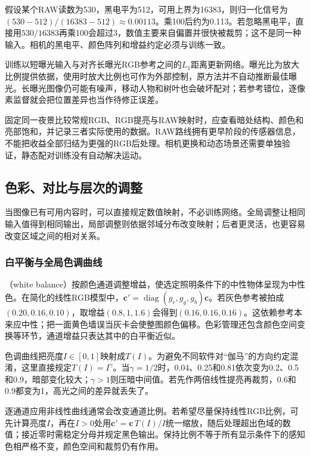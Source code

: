 假设某个RAW读数为530，黑电平为512，可用上界为16383，则归一化信号为$(530-512)/(16383-512)\approx0.00113$。乘100后约为0.113。若忽略黑电平，直接用$530/16383$再乘100会超过3，数值主要来自偏置并很快被裁剪；这不是同一种输入。相机的黑电平、颜色阵列和增益约定必须与训练一致。

训练以短曝光输入与对齐长曝光RGB参考之间的$L_1$距离更新网络。曝光比为放大比例提供依据，使用时放大比例也可作为外部控制，原方法并不自动推断最佳曝光。长曝光图像仍可能有噪声，移动人物和树叶也会破坏配对；若参考错位，逐像素监督就会把位置差异也当作待修正误差。

固定同一夜景比较常规RGB、RGB提亮与RAW映射时，应查看暗处结构、颜色和亮部饱和，并记录三者实际使用的数据。RAW路线拥有更早阶段的传感器信息，不能把收益全部归结为更强的RGB后处理。相机更换和动态场景还需要单独验证，静态配对训练没有自动解决运动。

\subsection{色彩、对比与层次的调整}
\label{sec:vision-restoration-tone}

当图像已有可用内容时，可以直接规定数值映射，不必训练网络。全局调整让相同输入值得到相同输出，局部调整则依据邻域分布改变映射；后者更灵活，也更容易改变区域之间的相对关系。

\subsubsection{白平衡与全局色调曲线}
\label{sec:vision-restoration-white-balance}

（white balance）按颜色通道调整增益，使选定照明条件下的中性物体呈现为中性色。在简化的线性RGB模型中，$\bm{c}'=\operatorname{diag}(g_r,g_g,g_b)\bm{c}$。若灰色参考被拍成$(0.20,0.16,0.10)$，取增益$(0.8,1,1.6)$会得到$(0.16,0.16,0.16)$。这依赖参考本来应中性；把一面黄色墙误当灰卡会使整图颜色偏移。色彩管理还包含颜色空间变换等环节，通道增益只表达其中的白平衡近似。

色调曲线把亮度$I\in[0,1]$映射成$T(I)$。为避免不同软件对“伽马”的方向约定混淆，这里直接规定$T(I)=I^\gamma$。当$\gamma=1/2$时，0.04、0.25和0.81依次变为0.2、0.5和0.9，暗部变化较大；$\gamma>1$则压暗中间值。若先作两倍线性提亮再裁剪，0.6和0.9都变为1，高光之间的差异就丢失了。

逐通道应用非线性曲线通常会改变通道比例。若希望尽量保持线性RGB比例，可先计算亮度$I$，再在$I>0$处用$\bm{c}'=\bm{c}\,T(I)/I$统一缩放，随后处理超出色域的数值；接近零时需稳定分母并规定黑色输出。保持比例不等于所有显示条件下的感知色相严格不变，颜色空间和裁剪仍有作用。

